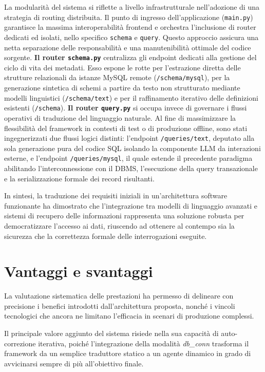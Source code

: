 La modularità del sistema si riflette a livello infrastrutturale
nell'adozione di una strategia di routing distribuita. Il punto di
ingresso dell'applicazione (\texttt{main.py}) garantisce la massima
interoperabilità frontend e orchestra l'inclusione di router dedicati ed
isolati, nello specifico \texttt{schema} e \texttt{query}. Questo
approccio assicura una netta separazione delle responsabilità e una
manutenibilità ottimale del codice sorgente. \textbf{Il router
\texttt{schema.py}} centralizza gli endpoint dedicati alla gestione del
ciclo di vita dei metadati. Esso espone le rotte per l'estrazione
diretta delle strutture relazionali da istanze MySQL remote
(\texttt{/schema/mysql}), per la generazione sintetica di schemi a
partire da testo non strutturato mediante modelli linguistici
(\texttt{/schema/text}) e per il raffinamento iterativo delle
definizioni esistenti (\texttt{/schema}). \textbf{Il router
\texttt{query.py}} si occupa invece di governare i flussi operativi di
traduzione del linguaggio naturale. Al fine di massimizzare la
flessibilità del framework in contesti di test o di produzione offline,
sono stati ingegnerizzati due flussi logici distinti: l'endpoint
\texttt{/queries/text}, deputato alla sola generazione pura del codice
SQL isolando la componente LLM da interazioni esterne, e l'endpoint
\texttt{/queries/mysql}, il quale estende il precedente paradigma
abilitando l'interconnessione con il DBMS, l'esecuzione della query
transazionale e la serializzazione formale dei record risultanti.

In sintesi, la traduzione dei requisiti iniziali in un'architettura
software funzionante ha dimostrato che l'integrazione tra modelli di
linguaggio avanzati e sistemi di recupero delle informazioni rappresenta
una soluzione robusta per democratizzare l'accesso ai dati, riuscendo ad ottenere
al contempo sia la sicurezza che la correttezza formale delle interrogazioni
eseguite.

\section{Vantaggi e svantaggi}\label{vantaggi-e-svantaggi}

La valutazione sistematica delle prestazioni ha permesso di delineare
con precisione i benefici introdotti dall'architettura proposta, nonché
i vincoli tecnologici che ancora ne limitano l'efficacia in scenari di
produzione complessi.

Il principale valore aggiunto del sistema risiede nella sua capacità di
auto-correzione iterativa, poiché l'integrazione della modalità
\emph{db\_conn} trasforma il framework da un semplice traduttore statico
a un agente dinamico in grado di avvicinarsi sempre di più all'obiettivo finale.

